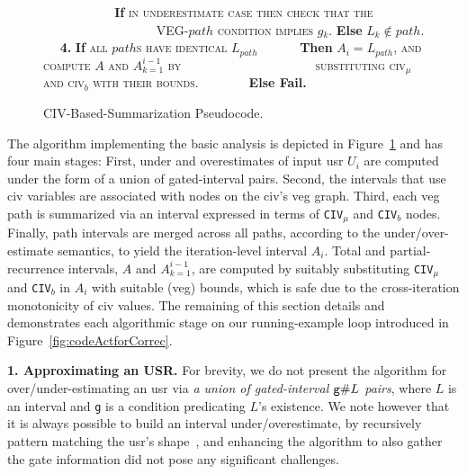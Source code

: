 \documentclass[10pt,nocopyrightspace]{sigplanconf}
\begin{document}
\begin{figure}[t]
\begin{small}
$\mbox{ }\mbox{ }\mbox{ }\mbox{ }\mbox{ }\mbox{ }\mbox{ }\mbox{ }$
           {\bf If} \textsc{in underestimate case} \textsc{then check that the}
$\mbox{ }\mbox{ }\mbox{ }\mbox{ }\mbox{ }\mbox{ }\mbox{ }\mbox{ }\mbox{ }\mbox{ }\mbox{ }\mbox{ }\mbox{ }$
\textsc{VEG-$path$ condition implies $g_k$}. {\bf Else} $L_k \not\in path$.\vspace{2ex}\newline
$\mbox{ }\mbox{ }${\bf4.} {\bf If} \textsc{all $path$s have identical $L_{path}$}\newline 
$\mbox{ }\mbox{ }\mbox{ }\mbox{ }$
            {\bf Then} \textsc{$A_i = L_{path}$, and compute $A$ and $A_{k=1}^{i-1}$ by}\newline 
$\mbox{ }\mbox{ }\mbox{ }\mbox{ }\mbox{ }\mbox{ }\mbox{ }\mbox{ }\mbox{ }\mbox{ }\mbox{ }\mbox{ }\mbox{ }\mbox{ }\mbox{ }$
\textsc{substituting civ$_\mu$ and civ$_b$ with their bounds.}\newline
$\mbox{ }\mbox{ }\mbox{ }\mbox{ }\mbox{ }$ {\bf Else Fail.}\vspace{1ex}
\end{small}
\caption{ CIV-Based-Summarization Pseudocode.}
\label{fig:BasicTechnique} %
\end{figure}


The algorithm implementing the basic analysis is depicted in 
Figure~\ref{fig:BasicTechnique} and has four main stages: 
First, under and overestimates of input {\sc usr} $U_i$ are 
computed under the form of a union of gated-interval pairs.   
Second, the intervals that use {\sc civ} variables are 
associated with nodes on the {\sc civ}'s {\sc veg} graph. 
Third, each {\sc veg} path is summarized via an interval expressed 
in terms of {\tt CIV$_\mu$} and {\tt CIV$_b$} nodes.\\
\noindent Finally, path intervals are merged across all paths, according to 
the under/over-estimate semantics, to yield the iteration-level interval $A_i$.
Total and partial-recurrence intervals, $A$ and $A_{k=1}^{i-1}$, 
are computed by suitably substituting {\tt CIV$_\mu$} and 
{\tt CIV$_b$} in $A_i$ with suitable ({\sc veg}) bounds,
which is safe due to the cross-iteration monotonicity of {\sc civ} values.
The remaining of this section details and demonstrates each algorithmic stage
on our running-example loop introduced in Figure~\ref{fig:codeActforCorrec}.

\vspace{1ex}

{\bf 1. Approximating an USR.} 
For brevity, we do not present the algorithm for
over/under-estimating an {\sc usr} via 
{\em a union of gated-interval ${\tt g}\#L$ pairs}, where $L$ is an 
interval and {\tt g} is a condition predicating $L$'s existence.  
%
We note however that it is always possible to build an interval 
under/overestimate, by recursively pattern matching the {\sc usr}'s 
shape~\cite{SummaryMonot}, and enhancing the algorithm to also gather 
the gate information did not pose any significant challenges.
  
\end{document}

